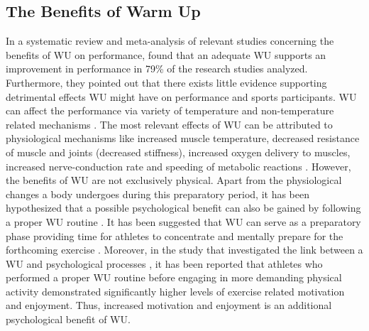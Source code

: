 \subsection{The Benefits of Warm Up}
In a systematic review and meta-analysis of relevant studies concerning the benefits of WU on performance, \cite{fradkin2006does} found that an adequate WU supports an improvement in performance in 79\% of the research studies analyzed. Furthermore, they pointed out that there exists little evidence supporting detrimental effects WU might have on performance and sports participants.
WU can affect the performance via variety of temperature and non-temperature related mechanisms \cite{bishop2003warm1}. 
The most relevant effects of WU can be attributed to physiological mechanisms like increased muscle temperature, decreased resistance of muscle and joints (decreased stiffness), increased oxygen delivery to muscles, increased nerve-conduction rate and speeding of metabolic reactions \cite{bishop2003warm1}. 
However, the benefits of WU are not exclusively physical. Apart from the physiological changes a body undergoes during this preparatory period, it has been hypothesized that a possible psychological benefit can also be gained by following a proper WU routine \cite{bishop2003warm1,shellock1985warming}.
It has been suggested that WU can serve as a preparatory phase providing time for athletes to concentrate and mentally prepare for the forthcoming exercise \cite{shellock1985warming}. 
Moreover, in the study that investigated the link between a WU and psychological processes \cite{ladwig2013psychological}, it has been reported that athletes who performed a proper WU routine before engaging in more demanding physical activity demonstrated significantly higher levels of exercise related motivation and enjoyment. Thus, increased motivation and enjoyment is an additional psychological benefit of WU.
